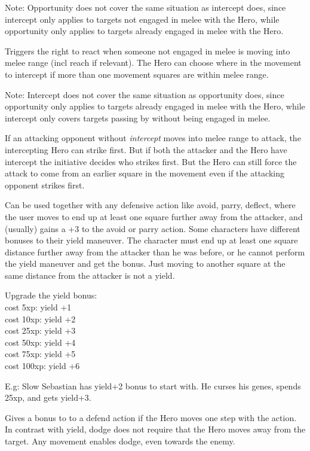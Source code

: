 Note: Opportunity does not cover the same situation as intercept does, since intercept only applies to targets not engaged in melee with the Hero, while opportunity only applies to targets already engaged in melee with the Hero.


Triggers the right to react when someone not engaged in melee is moving into melee range (incl reach if relevant). The Hero can choose where in the movement to intercept if more than one movement squares are within melee range.

Note: Intercept does not cover the same situation as opportunity does, since opportunity only applies to targets already engaged in melee with the Hero, while intercept only covers targets passing by without being engaged in melee.

If an attacking opponent without \emph{intercept} moves into melee range to attack, the intercepting Hero can strike first. But if both the attacker and the Hero have intercept the initiative decides who strikes first. But the Hero can still force the attack to come from an earlier square in the movement even if the attacking opponent strikes first.


Can be used together with any defensive action like avoid, parry, deflect, where the user moves to end up at least one square further away from the attacker, and (usually) gains a +3 to the avoid or parry action. Some characters have different bonuses to their yield maneuver. The character must end up at least one square distance further away from the attacker than he was before, or he cannot perform the yield maneuver and get the bonus. Just moving to another square at the same distance from the attacker is not a yield.

Upgrade the yield bonus: \\
cost   5xp: yield +1 \\
cost  10xp: yield +2 \\
cost  25xp: yield +3 \\
cost  50xp: yield +4 \\
cost  75xp: yield +5 \\
cost 100xp: yield +6

E.g: Slow Sebastian has yield+2 bonus to start with. He curses his genes, spends 25xp, and gets yield+3.


Gives a bonus to to a defend action if the Hero moves one step with the action. In contrast with yield, dodge does not require that the Hero moves away from the target. Any movement enables dodge, even towards the enemy.

